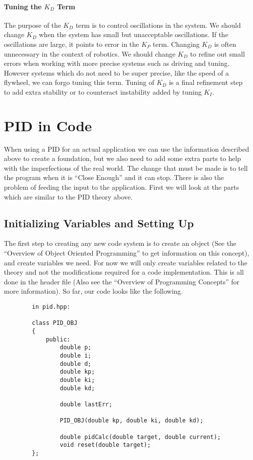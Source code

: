 \documentclass[12pt]{article}
\begin{document}
\paragraph{Tuning the $K_D$ Term}
    The purpose of the $K_D$ term is to control oscillations in the system. We should change $K_D$ when the system has small but unacceptable oscillations. If the oscillations are large, it points to error in the $K_P$ term. Changing $K_D$ is often unnecessary in the context of robotics. We should change $K_D$ to refine out small errors when working with more precise systems such as driving and tuning. However systems which do not need to be super precise, like the speed of a flywheel, we can forgo tuning this term. Tuning of $K_D$ is a final refinement step to add extra stability or to counteract instability added by tuning $K_I$.

\newpage
\section{PID in Code}
    When using a PID for an actual application we can use the information described above to create a foundation, but we also need to add some extra parts to help with the imperfections of the real world. The change that must be made is to tell the program when it is ``Close Enough'' and it can stop. There is also the problem of feeding the input to the application. First we will look at the parts which are similar to the PID theory above.

\subsection{Initializing Variables and Setting Up}
    The first step to creating any new code system is to create an object (See the ``Overview of Object Oriented Programming'' to get information on this concept), and create variables we need. For now we will only create variables related to the theory and not the modifications required for a code implementation. This is all done in the header file (Also see the ``Overview of Programming Concepts'' for more information). So far, our code looks like the following.

    \begin{verbatim}
        in pid.hpp:

        class PID_OBJ
        {
            public:
                double p;
                double i;
                double d;
                double kp;
                double ki;
                double kd;

                double lastErr;

                PID_OBJ(double kp, double ki, double kd);

                double pidCalc(double target, double current);
                void reset(double target);
        };
    \end{verbatim}
\end{document}
